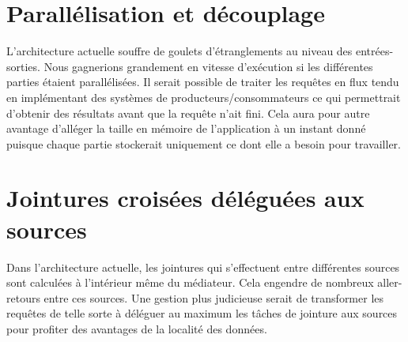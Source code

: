 \section{Parallélisation et découplage}

L’architecture actuelle souffre de goulets d’étranglements au niveau des entrées-sorties. Nous gagnerions grandement en vitesse d’exécution si les différentes parties étaient parallélisées. Il serait possible de traiter les requêtes en flux tendu en implémentant des systèmes de producteurs/consommateurs ce qui permettrait d’obtenir des résultats avant que la requête n’ait  fini. Cela aura pour autre avantage d’alléger la taille en mémoire de l'application à un instant donné puisque chaque partie stockerait uniquement ce dont elle a besoin pour travailler.

\section{Jointures croisées déléguées aux sources}

Dans l’architecture actuelle, les jointures qui s’effectuent entre différentes sources sont calculées à l’intérieur même du médiateur. Cela engendre de nombreux aller-retours entre ces sources. Une gestion plus judicieuse serait de transformer les requêtes de telle sorte à déléguer au maximum les tâches de jointure aux sources pour profiter des avantages de la localité des données.